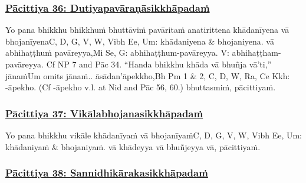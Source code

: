 \subsubsection*{\hyperref[exp36]{Pācittiya 36: Dutiyapavāraṇāsikkhāpadaṁ}}
\label{pac36}

Yo pana bhikkhu bhikkhuṁ bhuttāviṁ pavāritaṁ anatirittena khādanīyena vā bhojanīyena\makeatletter\hyperlink{endnote-appendix}\makeatother C, D, G, V, W, Vibh Ee, Um: khādaniyena & bhojaniyena. vā abhihaṭṭhuṁ pavāreyya,\makeatletter\hyperlink{endnote-appendix}\makeatother Mi Se, G: abhihaṭṭhum-pavāreyya. V: abhihaṭṭham-pavāreyya. Cf NP 7 and Pāc 34. ``Handa bhikkhu khāda vā bhuñja vā'ti,'' jānaṁ\makeatletter\hyperlink{endnote-appendix}\makeatother Um omits jānaṁ.. āsādan'āpekkho,\makeatletter\hyperlink{endnote-appendix}\makeatother Bh Pm 1 & 2, C, D, W, Ra, Ce Kkh: -āpekho. (Cf -āpekho v.l. at Nid and Pāc 56, 60.) bhuttasmiṁ, pācittiyaṁ.



\subsubsection*{\hyperref[exp37]{Pācittiya 37: Vikālabhojanasikkhāpadaṁ}}
\label{pac37}

Yo pana bhikkhu vikāle khādanīyaṁ vā bhojanīyaṁ\makeatletter\hyperlink{endnote-appendix}\makeatother C, D, G, V, W, Vibh Ee, Um: khādaniyaṁ & bhojaniyaṁ. vā khādeyya vā bhuñjeyya vā, pācittiyaṁ.



\subsubsection*{\hyperref[exp38]{Pācittiya 38: Sannidhikārakasikkhāpadaṁ}}
\label{pac38}

